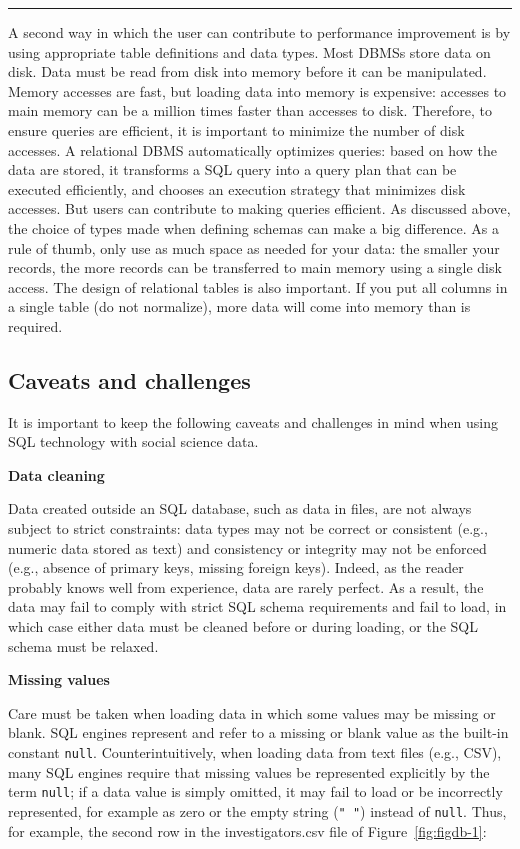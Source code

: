 \documentclass[]{krantz}
\begin{document}
\begin{center}\rule{0.5\linewidth}{\linethickness}\end{center}

A second way in which the user can contribute to performance improvement
is by using appropriate table definitions and data types. Most DBMSs
store data on disk. Data must be read from disk into memory before it
can be manipulated. Memory accesses are fast, but loading data into
memory is expensive: accesses to main memory can be a million times
faster than accesses to disk. Therefore, to ensure queries are
efficient, it is important to minimize the number of disk accesses. A
relational DBMS automatically optimizes queries: based on how the data
are stored, it transforms a SQL query into a query plan that can be
executed efficiently, and chooses an execution strategy that minimizes
disk accesses. But users can contribute to making queries efficient. As
discussed above, the choice of types made when defining schemas can make
a big difference. As a rule of thumb, only use as much space as needed
for your data: the smaller your records, the more records can be
transferred to main memory using a single disk access. The design of
relational tables is also important. If you put all columns in a single
table (do not normalize), more data will come into memory than is
required.

\subsection{Caveats and challenges}\label{caveats-and-challenges}

It is important to keep the following caveats and challenges in mind
when using SQL technology with social science data.

\textbf{Data cleaning}

Data created outside an SQL database, such as data in files, are not
always subject to strict constraints: data types may not be correct or
consistent (e.g., numeric data stored as text) and consistency or
integrity may not be enforced (e.g., absence of primary keys, missing
foreign keys). Indeed, as the reader probably knows well from
experience, data are rarely perfect. As a result, the data may fail to
comply with strict SQL schema requirements and fail to load, in which
case either data must be cleaned before or during loading, or the SQL
schema must be relaxed.

\textbf{Missing values}

Care must be taken when loading data in which some values may be missing
or blank. SQL engines represent and refer to a missing or blank value as
the built-in constant \texttt{null}. Counterintuitively, when loading
data from text files (e.g., CSV), many SQL engines require that missing
values be represented explicitly by the term \texttt{null}; if a data
value is simply omitted, it may fail to load or be incorrectly
represented, for example as zero or the empty string (\texttt{"\ "})
instead of \texttt{null}. Thus, for example, the second row in the
investigators.csv file of Figure~\ref{fig:figdb-1}:
\end{document}
